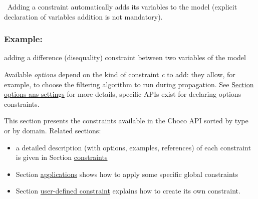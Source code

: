 

\begin{notedef}\
Adding a constraint automatically adds its variables to the model (explicit declaration of variables addition is not mandatory).
\end{notedef}


\subsubsection{Example:} adding a difference (disequality) constraint between two variables of the model



Available \emph{options} depend on the kind of constraint \emph{c} to add: they allow, for example, to choose the filtering algorithm to run during propagation. See \hyperlink{optionssettings}{Section options ans settings} for more details, specific APIs exist for declaring options constraints.

This section presents the constraints available in the Choco API sorted by type or by domain. Related sections:
\begin{itemize}
\item a detailed description (with options, examples, references) of each constraint is given in Section \hyperlink{ch:constraints}{constraints}
\item Section \hyperlink{doc:applications}{applications} shows how to apply some specific global constraints
\item Section \hyperlink{advanced:defineyourownconstraint}{user-defined constraint} explains how to create its own constraint.
\end{itemize}


